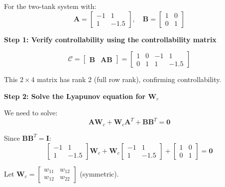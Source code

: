 \begin{example}
\label{ex:two_tank_gramian}
For the two-tank system with:
\begin{equation}
\mathbf{A} = \begin{bmatrix} -1 & 1 \\ 1 & -1.5 \end{bmatrix}, \quad
\mathbf{B} = \begin{bmatrix} 1 & 0 \\ 0 & 1 \end{bmatrix}
\end{equation}

\textbf{Step 1: Verify controllability using the controllability matrix}

\begin{equation}
\mathcal{C} = \begin{bmatrix} \mathbf{B} & \mathbf{A}\mathbf{B} \end{bmatrix} = \begin{bmatrix} 1 & 0 & -1 & 1 \\ 0 & 1 & 1 & -1.5 \end{bmatrix}
\end{equation}

This $2 \times 4$ matrix has rank 2 (full row rank), confirming controllability.

\textbf{Step 2: Solve the Lyapunov equation for $\mathbf{W}_c$}

We need to solve:
\begin{equation}
\mathbf{A}\mathbf{W}_c + \mathbf{W}_c\mathbf{A}^T + \mathbf{B}\mathbf{B}^T = \mathbf{0}
\end{equation}

Since $\mathbf{B}\mathbf{B}^T = \mathbf{I}$:
\begin{equation}
\begin{bmatrix} -1 & 1 \\ 1 & -1.5 \end{bmatrix} \mathbf{W}_c + \mathbf{W}_c \begin{bmatrix} -1 & 1 \\ 1 & -1.5 \end{bmatrix} + \begin{bmatrix} 1 & 0 \\ 0 & 1 \end{bmatrix} = \mathbf{0}
\end{equation}

Let $\mathbf{W}_c = \begin{bmatrix} w_{11} & w_{12} \\ w_{12} & w_{22} \end{bmatrix}$ (symmetric).


\end{example}
